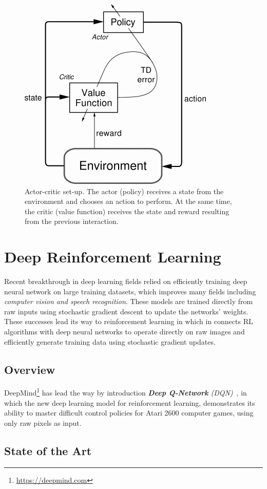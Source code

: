 \begin{figure}[!htb]
	\centering
		\includegraphics[width=.3\linewidth]{figures/actor_critic.png}
		\caption{Actor-critic set-up. The actor (policy) receives a state from the environment and chooses an action to perform. At the same time, the critic (value function) receives the state and reward resulting from the previous interaction.~\parencite{arulkumaran2017brief}}
		\label{fig:actor_critic}
\end{figure}



\section{Deep Reinforcement Learning}

Recent breakthrough in deep learning fields relied on efficiently training deep neural network on large training datasets, which improves many fields including \textit{computer vision and speech recognition}. These models are trained directly from raw inputs using stochastic gradient descent to update the networks' weights. These successes lead its way to reinforcement learning in which in connects RL algorithms with deep neural networks to operate directly on raw images and efficiently generate training data using stochastic gradient updates.

\subsection{Overview}
DeepMind\footnote{\url{https://deepmind.com}\label{deepmind}} has lead the way by introduction \textit{\textbf{Deep Q-Network} (DQN)}~\parencite{mnih2015human}, in which the new deep learning model for reinforcement learning, demonstrates its ability to master difficult control policies for Atari 2600 computer games, using only raw pixels as input.

\subsection{State of the Art}

